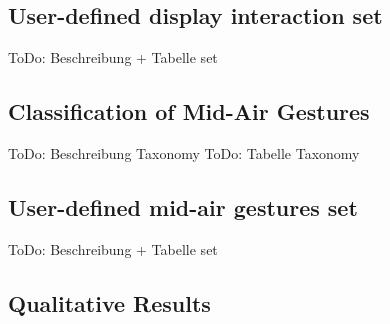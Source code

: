 \documentclass[sigchi]{acmart}
\begin{document}
	\subsection{User-defined display interaction set}
	ToDo: Beschreibung + Tabelle set
	\subsection{Classification of Mid-Air Gestures}
	ToDo: Beschreibung Taxonomy
	ToDo: Tabelle Taxonomy
	\subsection{User-defined mid-air gestures set}
	ToDo: Beschreibung + Tabelle set
	
	\subsection{Qualitative Results}
\end{document}
